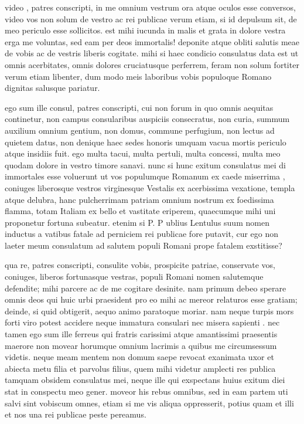 
 video , patres conscripti, in me omnium vestrum ora atque oculos esse conversos, video vos non solum de vestro ac rei publicae verum etiam, si id depulsum sit, de meo periculo esse sollicitos. est mihi iucunda in malis et grata in dolore vestra erga me voluntas, sed eam per deos immortalis! deponite atque obliti salutis meae de vobis ac de vestris liberis cogitate. mihi si haec condicio consulatus data est ut omnis acerbitates, omnis dolores cruciatusque perferrem, feram non solum fortiter verum etiam libenter, dum modo meis laboribus vobis populoque Romano dignitas salusque pariatur.

 ego sum ille consul, patres conscripti, cui non forum in quo omnis aequitas continetur, non campus consularibus auspiciis consecratus, non curia, summum auxilium omnium gentium, non domus, commune perfugium, non lectus ad quietem datus, non denique haec sedes honoris umquam vacua mortis periculo atque insidiis fuit. ego multa tacui, multa pertuli, multa concessi, multa meo quodam dolore in vestro timore sanavi. nunc si hunc exitum consulatus mei di immortales esse voluerunt ut vos populumque Romanum ex caede miserrima , coniuges liberosque vestros virginesque Vestalis ex acerbissima vexatione, templa atque delubra, hanc pulcherrimam patriam omnium nostrum ex foedissima flamma, totam Italiam ex bello et vastitate eriperem, quaecumque mihi uni proponetur fortuna subeatur. etenim si P. P ublius Lentulus suum nomen inductus a vatibus fatale ad perniciem rei publicae fore putavit, cur ego non laeter meum consulatum ad salutem populi Romani prope fatalem exstitisse?

 qua re, patres conscripti, consulite vobis, prospicite patriae, conservate vos, coniuges, liberos fortunasque vestras, populi Romani nomen salutemque defendite; mihi parcere ac de me cogitare desinite. nam primum debeo sperare omnis deos qui huic urbi praesident pro eo mihi ac mereor relaturos esse gratiam; deinde, si quid obtigerit, aequo animo paratoque moriar. nam neque turpis mors forti viro potest accidere neque immatura consulari nec misera sapienti . nec tamen ego sum ille ferreus qui fratris carissimi atque amantissimi praesentis maerore non movear horumque omnium lacrimis a quibus me circumsessum videtis. neque meam mentem non domum saepe revocat exanimata uxor et abiecta metu filia et parvolus filius, quem mihi videtur amplecti res publica tamquam obsidem consulatus mei, neque ille qui exspectans huius exitum diei stat in conspectu meo gener. moveor his rebus omnibus, sed in eam partem uti salvi sint vobiscum omnes, etiam si me vis aliqua oppresserit, potius quam et illi et nos una rei publicae peste pereamus.

